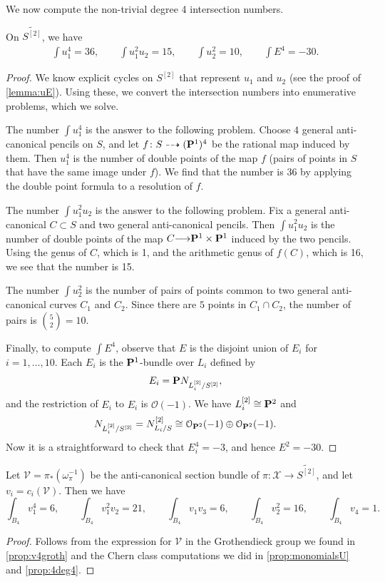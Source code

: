 \documentclass[11pt,reqno, letterpaper]{amsart}
\renewcommand{\to}{{\longrightarrow}}
\numberwithin{equation}{section}
\renewcommand{\O}{\mathcal O}
\begin{document}
We now compute the non-trivial degree 4 intersection numbers.
\begin{proposition}
  \label{prop:monomialsU}
  On $\widetilde{S^{[2]}}$, we have
  \[
    \begin{split}
      \int u_{1}^{4} = 36, \qquad   \int u_{1}^{2}u_{2} = 15, \qquad 
      \int  u_{2}^{2} = 10, \qquad    \int  E^{4} = -30.
    \end{split}
\]
\end{proposition}
\begin{proof}
  We know explicit cycles on $S^{[2]}$ that represent $u_1$ and $u_2$ (see the proof of \autoref{lemma:uE}).
  Using these, we convert the intersection numbers into enumerative problems, which we solve.

  The number $\int u_1^4$ is the answer to the following problem.
  Choose $4$ general anti-canonical pencils on $S$, and let $f \colon S \dashrightarrow (\P^1)^4$ be the rational map induced by them.
  Then $u_1^4$ is the number of double points of the map $f$ (pairs of points in $S$ that have the same image under $f$).
  We find that the number is 36 by applying the double point formula \cite[Theorem~2]{ful:78} to a resolution of $f$.

  The number $\int u_{1}^{2}u_{2}$ is the answer to the following problem.
  Fix a general anti-canonical $C \subset S$ and two general anti-canonical pencils.
  Then $\int u_1^2u_2$ is the number of double points of the map $C \to \P^1 \times \P^1$ induced by the two pencils.
  Using the genus of $C$, which is 1, and the arithmetic genus of $f(C)$, which is 16, we see that the number is 15.

  The number $\int u_2^2$ is the number of pairs of points common to two general anti-canonical curves $C_1$ and $C_2$.
  Since there are $5$ points in $C_1 \cap C_2$, the number of pairs is ${5 \choose 2} = 10$.

  Finally, to compute $\int E^4$, observe that $E$ is the disjoint union of $E_i$ for $i = 1, \dots, 10$.
  Each $E_i$ is the $\P^1$-bundle over $L_i$ defined by
  \[ E_i = \P N_{L_i^{[2]}/S^{[2]}},\]
  and the restriction of $E_i$ to $E_i$ is $\O(-1)$.
  We have $L_i^{[2]} \cong \P^2$ and
  \[ N_{L_i^{[2]}/S^{[2]}} = N_{L_i/S}^{[2]} \cong \O_{\P^2}(-1) \oplus \O_{\P^2}(-1).\]
  Now it is a straightforward to check that $E_i^4 = -3$, and hence $E^2 = -30$.
\end{proof}
\begin{proposition}\label{prop:4deg4}
  Let $\mathcal V = \pi_*\left(  \omega_{\pi}^{-1} \right)$ be the anti-canonical section bundle of $\pi \colon \mathcal X \to \widetilde{S^{[2]}}$,
  and let $v_i = c_i(\mathcal V)$.
  Then we have
  \[
    \int_{B_{4}} v_{1}^{4} = 6, \qquad
    \int_{B_{4}} v_{1}^{2}v_{2} = 21, \qquad
      \int_{B_{4}} v_{1}v_{3} = 6, \qquad
      \int_{B_{4}} v_{2}^{2} = 16, \qquad
      \int_{B_{4}} v_{4} = 1.
  \]
\end{proposition}
\begin{proof}
  Follows from the expression for $\mathcal V$ in the Grothendieck group we found in \autoref{prop:v4groth} and the Chern class computations we did in \autoref{prop:monomialsU} and \autoref{prop:4deg4}.
\end{proof}
\end{document}
